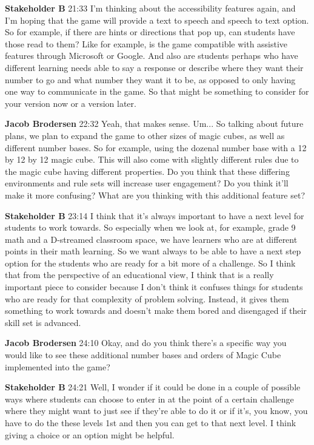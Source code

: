 \documentclass{article}
\begin{document}
\noindent \textbf{Stakeholder B}   21:33
I'm thinking about the accessibility features again, and I'm hoping that the game will provide a text to speech and speech to text option. So for example, if there are hints or directions that pop up, can students have those read to them? Like for example, is the game compatible with
assistive features through Microsoft or Google. And also are students perhaps who have different learning needs able to
say a response or describe where they want their number to go and what number they want it to be, as opposed to only having one way to communicate in the game. So that might be something to consider for your version now or a version later.

\noindent \textbf{Jacob Brodersen}   22:32
Yeah, that makes sense.
Um...
So talking about future plans, we plan to expand the game to other sizes of magic cubes, as well as different number bases. So for example, using the dozenal number base with a 12 by 12 by 12 magic cube. This will also come with slightly different rules due to the magic cube having different
properties. Do you think that these differing environments and rule sets will increase user engagement? Do you think it'll make it more confusing? What are you thinking with this additional feature set?

\noindent \textbf{Stakeholder B}   23:14
I think that it's always important to have a next level for students to work towards. So especially when we look at, for example, grade 9 math and a D-streamed classroom space, we have learners who are at
different points in their math learning. So we want always to be able to have a next step option for the students who are ready for a bit more of a challenge. So I think that from the perspective of an educational view, I think that is a really important piece to consider because I don't think it
confuses things for students who are ready for that complexity of problem solving. Instead, it gives them something to work towards and doesn't make them bored and disengaged if their skill set is advanced.

\noindent \textbf{Jacob Brodersen}   24:10
Okay, and do you think there's a specific way you would like to see these additional number bases and orders of Magic Cube implemented into the game?

\noindent \textbf{Stakeholder B}   24:21
Well, I wonder if it could be done in a couple of possible ways where students can choose to enter in at the point of a certain challenge where they might want to just see if they're able to do it or if it's, you know, you have to do the
these levels 1st and then you can get to that next level. I think giving a choice or an option might be helpful.
\end{document}
